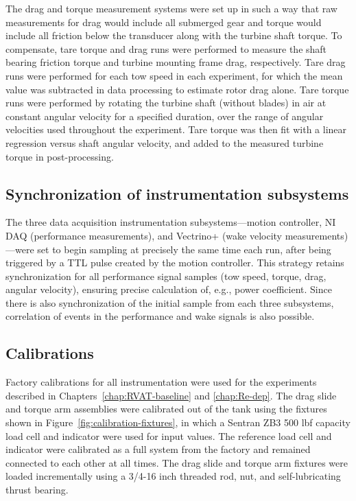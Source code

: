 The drag and torque measurement systems were set up in such a way that raw
measurements for drag would include all submerged gear and torque would include
all friction below the transducer along with the turbine shaft torque. To
compensate, tare torque and drag runs were performed to measure the shaft
bearing friction torque and turbine mounting frame drag, respectively. Tare drag
runs were performed for each tow speed in each experiment, for which the mean
value was subtracted in data processing to estimate rotor drag alone. Tare
torque runs were performed by rotating the turbine shaft (without blades) in air
at constant angular velocity for a specified duration, over the range of angular
velocities used throughout the experiment. Tare torque was then fit with a
linear regression versus shaft angular velocity, and added to the measured
turbine torque in post-processing.


\subsection{Synchronization of instrumentation subsystems}

The three data acquisition instrumentation subsystems---motion controller, NI
DAQ (performance measurements), and Vectrino+ (wake velocity
measurements)---were set to begin sampling at precisely the same time each run,
after being triggered by a TTL pulse created by the motion controller. This
strategy retains synchronization for all performance signal samples (tow speed,
torque, drag, angular velocity), ensuring precise calculation of, e.g., power
coefficient. Since there is also synchronization of the initial sample from each
three subsystems, correlation of events in the performance and wake signals is
also possible.


\subsection{Calibrations}

Factory calibrations for all instrumentation were used for the experiments
described in Chapters~\ref{chap:RVAT-baseline} and \ref{chap:Re-dep}. The drag
slide and torque arm assemblies were calibrated out of the tank using the
fixtures shown in Figure~\ref{fig:calibration-fixtures}, in which a Sentran ZB3
500 lbf capacity load cell and indicator were used for input values. The
reference load cell and indicator were calibrated as a full system from the
factory and remained connected to each other at all times. The drag slide and
torque arm fixtures were loaded incrementally using a 3/4-16 inch threaded rod,
nut, and self-lubricating thrust bearing.

